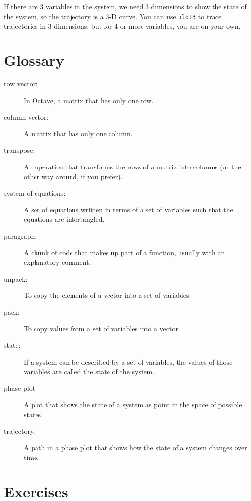 If there are 3 variables in the system, we need 3 dimensions to show
the state of the system, so the trajectory is a 3-D curve.
You can use {\tt plot3} to trace trajectories in 3 dimensions,
but for 4 or more variables, you are on your own.


\section{Glossary}

\begin{description}

\item[row vector:] In Octave, a matrix that has only one row. 

\item[column vector:] A matrix that has only one column. 

\item[transpose:] An operation that transforms the rows of a matrix
into columns (or the other way around, if you prefer). 

\item[system of equations:] A set of equations written in terms of
a set of variables such that the equations are intertangled.

\item[paragraph:] A chunk of code that makes up part of a function,
usually with an explanatory comment. 

\item[unpack:] To copy the elements of a vector into a set of variables.

\item[pack:] To copy values from a set of variables into a vector. 

\item[state:] If a system can be described by a set of variables,
the values of those variables are called the state of the system.

\item[phase plot:] A plot that shows the state of a system as point
in the space of possible states. 

\item[trajectory:] A path in a phase plot that shows how the state of
a system changes over time.


\end{description}

\section{Exercises}

